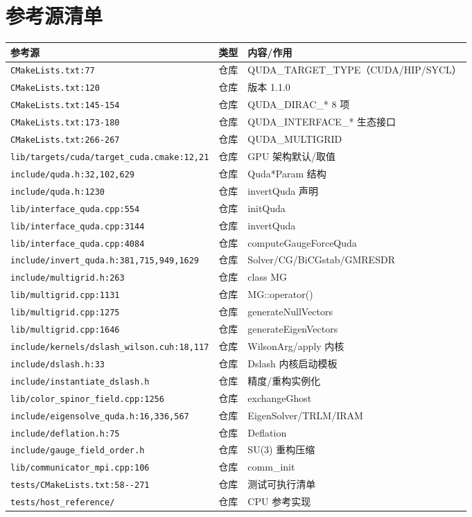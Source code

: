 \documentclass[UTF8]{ctexart}
\begin{document}
\section{参考源清单}
{\small
\begin{xltabular}{\textwidth}{XXX}
\toprule
\textcolor{evidence}{参考源} & 类型 & 内容/作用 \\
\midrule
\endhead
\nolinkurl{CMakeLists.txt:77} & 仓库 & QUDA\_TARGET\_TYPE（CUDA/HIP/SYCL）\\
\nolinkurl{CMakeLists.txt:120} & 仓库 & 版本 1.1.0 \\
\nolinkurl{CMakeLists.txt:145-154} & 仓库 & QUDA\_DIRAC\_* 8 项 \\
\nolinkurl{CMakeLists.txt:173-180} & 仓库 & QUDA\_INTERFACE\_* 生态接口 \\
\nolinkurl{CMakeLists.txt:266-267} & 仓库 & QUDA\_MULTIGRID \\
\nolinkurl{lib/targets/cuda/target_cuda.cmake:12,21} & 仓库 & GPU 架构默认/取值 \\
\nolinkurl{include/quda.h:32,102,629} & 仓库 & Quda*Param 结构 \\
\nolinkurl{include/quda.h:1230} & 仓库 & invertQuda 声明 \\
\nolinkurl{lib/interface_quda.cpp:554} & 仓库 & initQuda \\
\nolinkurl{lib/interface_quda.cpp:3144} & 仓库 & invertQuda \\
\nolinkurl{lib/interface_quda.cpp:4084} & 仓库 & computeGaugeForceQuda \\
\nolinkurl{include/invert_quda.h:381,715,949,1629} & 仓库 & Solver/CG/BiCGstab/GMRESDR \\
\nolinkurl{include/multigrid.h:263} & 仓库 & class MG \\
\nolinkurl{lib/multigrid.cpp:1131} & 仓库 & MG::operator() \\
\nolinkurl{lib/multigrid.cpp:1275} & 仓库 & generateNullVectors \\
\nolinkurl{lib/multigrid.cpp:1646} & 仓库 & generateEigenVectors \\
\nolinkurl{include/kernels/dslash_wilson.cuh:18,117} & 仓库 & WilsonArg/apply 内核 \\
\nolinkurl{include/dslash.h:33} & 仓库 & Dslash 内核启动模板 \\
\nolinkurl{include/instantiate_dslash.h} & 仓库 & 精度/重构实例化 \\
\nolinkurl{lib/color_spinor_field.cpp:1256} & 仓库 & exchangeGhost \\
\nolinkurl{include/eigensolve_quda.h:16,336,567} & 仓库 & EigenSolver/TRLM/IRAM \\
\nolinkurl{include/deflation.h:75} & 仓库 & Deflation \\
\nolinkurl{include/gauge_field_order.h} & 仓库 & SU(3) 重构压缩 \\
\nolinkurl{lib/communicator_mpi.cpp:106} & 仓库 & comm\_init \\
\nolinkurl{tests/CMakeLists.txt:58--271} & 仓库 & 测试可执行清单 \\
\nolinkurl{tests/host_reference/} & 仓库 & CPU 参考实现 \\
\bottomrule
\end{xltabular}
}
\end{document}
